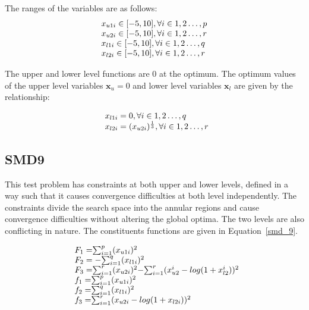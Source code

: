 The ranges of the variables are as follows:
\begin{equation}
\begin{array}{lr}
$$x_{u1i} \in  [-5,10],          \forall i \in {1,2\ldots,p}$$\\
$$x_{u2i} \in  [-5,10],          \forall i \in {1,2\ldots,r}$$\\
$$x_{l1i} \in  [-5,10],          \forall i \in {1,2\ldots,q}$$\\
$$x_{l2i} \in  [-5,10],          \forall i \in {1,2\ldots,r}$$
\end{array}
\label{smd_8_sub}
\end{equation}

The upper and lower level functions are 0 at the optimum. The optimum values of the upper level variables $\mathbf{x}_u=0$ and lower level variables $\mathbf{x}_l$ are given by the relationship: 

\begin{equation}
\begin{array}{lr}
\text{}\hspace{2mm} x_{l1i}=0,  \forall i \in {1,2\ldots,q} \\
\text{}\hspace{2mm} x_{l2i}=(x_{u2i})^\frac{1}{3},  \forall i \in {1,2\ldots,r} \\
\end{array}
\label{basic_8}
\end{equation}


\subsection{SMD9}

This test problem has constraints at both upper and lower levels, defined in a way such that it causes convergence difficulties at both level independently. The constraints divide the search space into the annular regions and cause convergence difficulties without altering the global optima. The two levels are also conflicting in nature. The constituents functions are given in Equation~\ref{smd_9}.

\begin{equation}
\begin{array}{lr}
\text{}\hspace{2mm} F_1=$$\sum_{	i=1}^{p} (x_{u1i})^{2} $$\\
\text{}\hspace{2mm} F_2=-$$\sum_{	i=1}^{q} (x_{l1i})^{2} $$\\
\text{}\hspace{2mm} F_3=$$\sum_{	i=1}^{r} (x_{u2i})^{2} $$-$$\sum_{	i=1}^{r} (x_{u2}^{i}-log (1+x_{l2}^{i}))^{2} $$\\
\text{}\hspace{2mm} f_1=$$\sum_{	i=1}^{p} (x_{u1i})^{2} $$\\
\text{}\hspace{2mm} f_2=$$\sum_{	i=1}^{q} (x_{l1i})^{2} $$\\
\text{}\hspace{2mm} f_3=$$\sum_{	i=1}^{r} (x_{u2i}-log (1+x_{l2i}))^{2} $$\\
\end{array}
\label{smd_9}
\end{equation}

